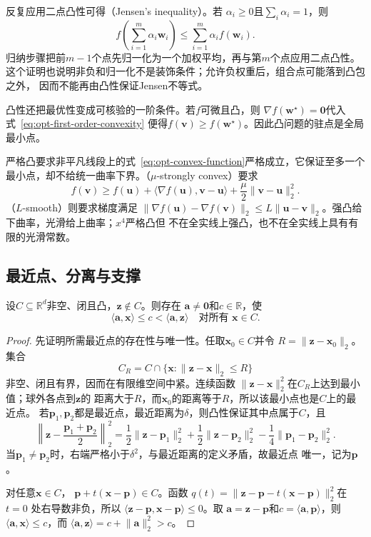 反复应用二点凸性可得（Jensen's inequality）。若
$\alpha_i\geq0$且$\sum_i\alpha_i=1$，则
\begin{equation}
  f\left(\sum_{i=1}^m\alpha_i\bm{w}_i\right)
  \leq\sum_{i=1}^m\alpha_i f(\bm{w}_i).
  \label{eq:opt-jensen}
\end{equation}
归纳步骤把前$m-1$个点先归一化为一个加权平均，再与第$m$个点应用二点凸性。
这个证明也说明非负和归一化不是装饰条件；允许负权重后，组合点可能落到凸包之外，
因而不能再由凸性保证Jensen不等式。

凸性还把最优性变成可核验的一阶条件。若$f$可微且凸，则
$\nabla f(\bm{w}^{\star})=\bm{0}$代入式~\eqref{eq:opt-first-order-convexity}
便得$f(\bm{v})\geq f(\bm{w}^{\star})$。因此凸问题的驻点是全局最小点。

严格凸要求非平凡线段上的式~\eqref{eq:opt-convex-function}严格成立，它保证至多一个
最小点，却不给统一曲率下界。（$\mu$-strongly convex）要求
\[
  f(\bm{v})\geq f(\bm{u})+
  \langle\nabla f(\bm{u}),\bm{v}-\bm{u}\rangle
  +\frac{\mu}{2}\lVert\bm{v}-\bm{u}\rVert_2^2.
\]
（$L$-smooth）则要求梯度满足
$\lVert\nabla f(\bm{u})-\nabla f(\bm{v})\rVert_2
\leq L\lVert\bm{u}-\bm{v}\rVert_2$。强凸给下曲率，光滑给上曲率；$x^4$严格凸但
不在全实线上强凸，也不在全实线上具有有限的光滑常数。

\subsection{最近点、分离与支撑}

\begin{theorem}[闭凸集外一点的严格分离]
\label{thm:opt-projection-separation}
设$C\subseteq\mathbb{R}^d$非空、闭且凸，$\bm{z}\notin C$。则存在
$\bm{a}\neq\bm{0}$和$c\in\mathbb{R}$，使
\[
  \langle\bm{a},\bm{x}\rangle\leq c
  <\langle\bm{a},\bm{z}\rangle
  \quad\text{对所有 }\bm{x}\in C.
\]
\end{theorem}

\begin{proof}
先证明所需最近点的存在性与唯一性。任取$\bm{x}_0\in C$并令
$R=\lVert\bm{z}-\bm{x}_0\rVert_2$。集合
\[
  C_R=C\cap\{\bm{x}:\lVert\bm{z}-\bm{x}\rVert_2\leq R\}
\]
非空、闭且有界，因而在有限维空间中紧。连续函数
$\lVert\bm{z}-\bm{x}\rVert_2^2$在$C_R$上达到最小值；球外各点到$\bm{z}$的
距离大于$R$，而$\bm{x}_0$的距离等于$R$，所以该最小点也是$C$上的最近点。
若$\bm{p}_1,\bm{p}_2$都是最近点，最近距离为$\delta$，则凸性保证其中点属于$C$，且
\[
  \left\lVert\bm{z}-\frac{\bm{p}_1+\bm{p}_2}{2}\right\rVert_2^2
  =
  \frac12\lVert\bm{z}-\bm{p}_1\rVert_2^2
  +\frac12\lVert\bm{z}-\bm{p}_2\rVert_2^2
  -\frac14\lVert\bm{p}_1-\bm{p}_2\rVert_2^2.
\]
当$\bm{p}_1\neq\bm{p}_2$时，右端严格小于$\delta^2$，与最近距离的定义矛盾，故最近点
唯一，记为$\bm{p}$。

对任意$\bm{x}\in C$，
$\bm{p}+t(\bm{x}-\bm{p})\in C$。函数
$q(t)=\lVert\bm{z}-\bm{p}-t(\bm{x}-\bm{p})\rVert_2^2$在$t=0$
处右导数非负，所以
$\langle\bm{z}-\bm{p},\bm{x}-\bm{p}\rangle\leq0$。取
$\bm{a}=\bm{z}-\bm{p}$和$c=\langle\bm{a},\bm{p}\rangle$，则
$\langle\bm{a},\bm{x}\rangle\leq c$，而
$\langle\bm{a},\bm{z}\rangle=c+\lVert\bm{a}\rVert_2^2>c$。
\end{proof}

